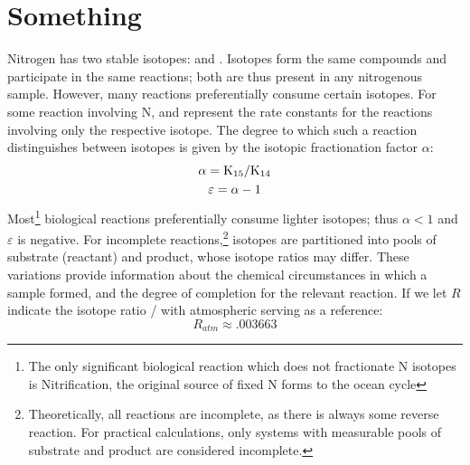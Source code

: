 \documentclass[12pt, twocolumn]{article}
\begin{document}
\section{Something}
\newcommand{\dN}{\delta\isotope[15]{N}}
Nitrogen has two stable isotopes:  and . Isotopes form the same compounds and participate in the same reactions; both are thus present in any nitrogenous sample. However, many reactions preferentially consume certain isotopes. For some reaction involving N,  and  represent the rate constants for the reactions involving only the respective isotope. The degree to which such a reaction distinguishes between isotopes is given by the isotopic fractionation factor $\alpha$:
\begin{gather}
    \alpha = \ce{K_{15}/K_{14}}\label{alpha}\\
    \varepsilon = \alpha - 1\label{epsilon}
\end{gather}
Most\footnote{The only significant biological reaction which does not fractionate N isotopes is Nitrification, the original source of fixed N forms to the ocean cycle} biological reactions preferentially consume lighter isotopes; thus $\alpha<1$ and $\varepsilon$ is negative. For incomplete reactions,\footnote{Theoretically, all reactions are incomplete, as there is always some reverse reaction. For practical calculations, only systems with measurable pools of substrate and product are considered incomplete.} isotopes are partitioned into pools of substrate (reactant) and product, whose isotope ratios may differ. These variations provide information about the chemical circumstances in which a sample formed, and the degree of completion for the relevant reaction. If we let $R$ indicate the  isotope ratio / with atmospheric  serving as a reference:
\begin{equation}
    R_{atm} \approx.003663\label{R}
\end{equation}
\end{document}
